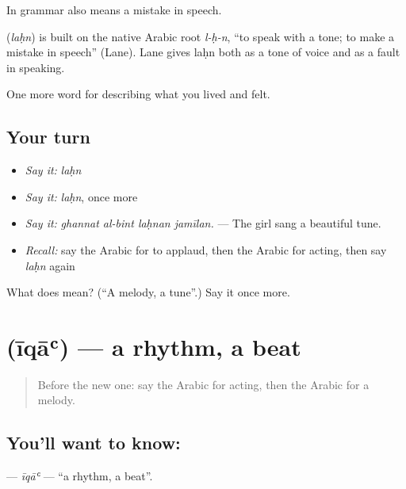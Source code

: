 In grammar  also means a mistake in speech.

\begin{cousinweb}
\textbf{} (\emph{laḥn}) is built on the native Arabic root \emph{l-ḥ-n}, \textquotedblleft{}to speak with a tone; to make a mistake in speech\textquotedblright{} (Lane). Lane gives laḥn both as a tone of voice and as a fault in speaking.
\end{cousinweb}

\begin{grammarlens}[title={What you've built}]
One more word for describing what you lived and felt.
\end{grammarlens}

\subsection*{Your turn}
\begin{itemize}
\raggedright
  \item \emph{Say it:} \emph{laḥn}
  \item \emph{Say it:} \emph{laḥn}, once more
  \item \emph{Say it:} \emph{ghannat al-bint laḥnan jamīlan.} — The girl sang a beautiful tune.
  \item \emph{Recall:} say the Arabic for to applaud, then the Arabic for acting, then say \emph{laḥn} again
\end{itemize}

\begin{tcolorbox}[breakable,colback=teal!4,colframe=teal!35!black,title={Before you move on}]
What does  mean? (\textquotedblleft{}A melody, a tune\textquotedblright{}.) Say it once more.
\end{tcolorbox}
\section[\texorpdfstring{\ar{إيقاع} (īqāʿ)}{إيقاع (īqāʿ)}]{ (īqāʿ) — a rhythm, a beat}

\label{lesson:AR-C543-iqa}



\begin{quote}
Before the new one: say the Arabic for acting, then the Arabic for a melody.
\end{quote}

\subsection*{You'll want to know: }
\textbf{} — \emph{īqāʿ} — \textquotedblleft{}a rhythm, a beat\textquotedblright{}.

